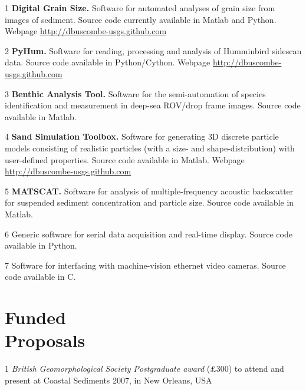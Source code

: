\documentclass[margin,line]{resume}
\begin{document}
\begin{resume}
\begin{footnotesize}
\begin{list1}
	\item[1] {\bf Digital Grain Size.} Software for automated analyses of grain size from images of sediment. Source code currently available in Matlab and Python. Webpage \url{http://dbuscombe-usgs.github.com}\\
	\item[2] {\bf PyHum.} Software for reading, processing and analysis of Humminbird sidescan data. Source code available in Python/Cython. Webpage \url{http://dbuscombe-usgs.github.com}\\
	\item[3] {\bf Benthic Analysis Tool.} Software for the semi-automation of species identification and measurement in deep-sea ROV/drop frame images. Source code available in Matlab.\\
        \item[4] {\bf Sand Simulation Toolbox.} Software for generating 3D discrete particle models consisting of realistic particles (with a size- and shape-distribution) with user-defined properties. Source code available in Matlab. Webpage \url{http://dbuscombe-usgs.github.com}\\
        \item[5] {\bf MATSCAT.} Software for analysis of multiple-frequency acoustic backscatter for suspended sediment concentration and particle size. Source code available in Matlab.\\
      \item[6] Generic software for serial data acquisition and real-time display. Source code available in Python.\\
        \item[7] Software for interfacing with machine-vision ethernet video cameras. Source code available in C.

	\end{list1}
        \end{footnotesize}

    \section{\mysidestyle Funded \\ Proposals}
        \begin{footnotesize}
	\begin{list1}
	\item[1] {\sl British Geomorphological Society Postgraduate award} ($\pounds$300) to attend and present at Coastal Sediments 2007, in New Orleans, USA\\
	

\end{list1}
\end{footnotesize}
\end{resume}
\end{document}
